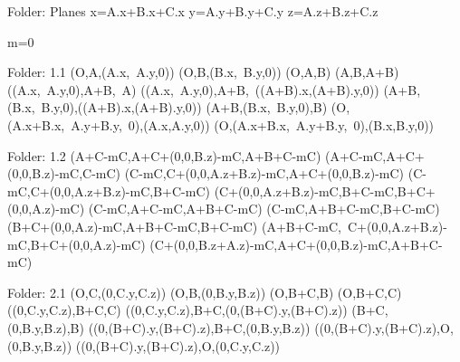 Folder: Planes
x=A.x+B.x+C.x
y=A.y+B.y+C.y
z=A.z+B.z+C.z


m=0


Folder: 1.1
\left(O,A,\left(A.x,\ A.y,0\right)\right)
\left(O,B,\left(B.x,\ B.y,0\right)\right)
\left(O,A,B\right)
\left(A,B,A+B\right)
\left(\left(A.x,\ A.y,0\right),A+B,\ A\right)
\left(\left(A.x,\ A.y,0\right),A+B,\ \left(\left(A+B\right).x,\left(A+B\right).y,0\right)\right)
\left(A+B,\left(B.x,\ B.y,0\right),\left(\left(A+B\right).x,\left(A+B\right).y,0\right)\right)
\left(A+B,\left(B.x,\ B.y,0\right),B\right)
\left(O,\left(A.x+B.x,\ A.y+B.y,\ 0\right),\left(A.x,A.y,0\right)\right)
\left(O,\left(A.x+B.x,\ A.y+B.y,\ 0\right),\left(B.x,B.y,0\right)\right)


Folder: 1.2
\left(A+C-mC,A+C+\left(0,0,B.z\right)-mC,A+B+C-mC\right)
\left(A+C-mC,A+C+\left(0,0,B.z\right)-mC,C-mC\right)
\left(C-mC,C+\left(0,0,A.z+B.z\right)-mC,A+C+\left(0,0,B.z\right)-mC\right)
\left(C-mC,C+\left(0,0,A.z+B.z\right)-mC,B+C-mC\right)
\left(C+\left(0,0,A.z+B.z\right)-mC,B+C-mC,B+C+\left(0,0,A.z\right)-mC\right)
\left(C-mC,A+C-mC,A+B+C-mC\right)
\left(C-mC,A+B+C-mC,B+C-mC\right)
\left(B+C+\left(0,0,A.z\right)-mC,A+B+C-mC,B+C-mC\right)
\left(A+B+C-mC,\ C+\left(0,0,A.z+B.z\right)-mC,B+C+\left(0,0,A.z\right)-mC\right)
\left(C+\left(0,0,B.z+A.z\right)-mC,A+C+\left(0,0,B.z\right)-mC,A+B+C-mC\right)


Folder: 2.1
\left(O,C,\left(0,C.y,C.z\right)\right)
\left(O,B,\left(0,B.y,B.z\right)\right)
\left(O,B+C,B\right)
\left(O,B+C,C\right)
\left(\left(0,C.y,C.z\right),B+C,C\right)
\left(\left(0,C.y,C.z\right),B+C,\left(0,\left(B+C\right).y,\left(B+C\right).z\right)\right)
\left(B+C,\left(0,B.y,B.z\right),B\right)
\left(\left(0,\left(B+C\right).y,\left(B+C\right).z\right),B+C,\left(0,B.y,B.z\right)\right)
\left(\left(0,\left(B+C\right).y,\left(B+C\right).z\right),O,\left(0,B.y,B.z\right)\right)
\left(\left(0,\left(B+C\right).y,\left(B+C\right).z\right),O,\left(0,C.y,C.z\right)\right)


